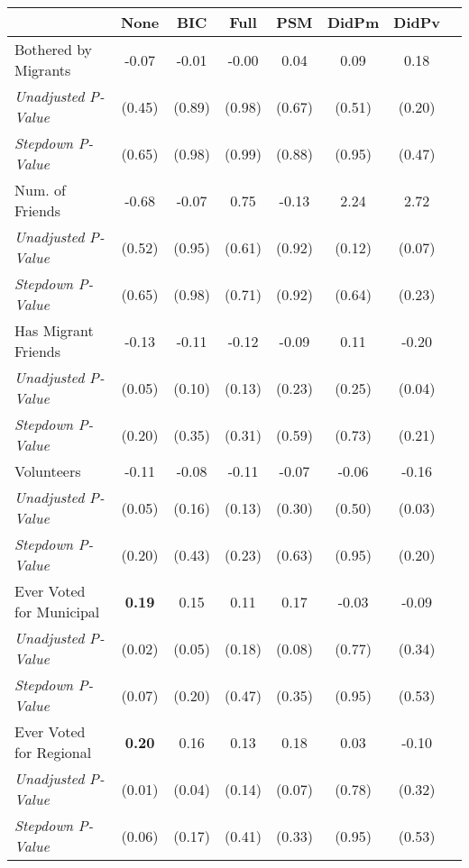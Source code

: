 \begin{tabular}{l c c c c c c c}
\toprule
 & None & BIC & Full & PSM & DidPm & DidPv \\
\midrule
Bothered by Migrants & -0.07 & -0.01 & -0.00 & 0.04 & 0.09 & 0.18 \\
\quad \textit{Unadjusted P-Value} & (0.45) & (0.89) & (0.98) & (0.67) & (0.51) & (0.20) \\
\quad \textit{Stepdown P-Value} & (0.65) & (0.98) & (0.99) & (0.88) & (0.95) & (0.47) \\
Num. of Friends & -0.68 & -0.07 & 0.75 & -0.13 & 2.24 & 2.72 \\
\quad \textit{Unadjusted P-Value} & (0.52) & (0.95) & (0.61) & (0.92) & (0.12) & (0.07) \\
\quad \textit{Stepdown P-Value} & (0.65) & (0.98) & (0.71) & (0.92) & (0.64) & (0.23) \\
Has Migrant Friends & -0.13 & -0.11 & -0.12 & -0.09 & 0.11 & -0.20 \\
\quad \textit{Unadjusted P-Value} & (0.05) & (0.10) & (0.13) & (0.23) & (0.25) & (0.04) \\
\quad \textit{Stepdown P-Value} & (0.20) & (0.35) & (0.31) & (0.59) & (0.73) & (0.21) \\
Volunteers & -0.11 & -0.08 & -0.11 & -0.07 & -0.06 & -0.16 \\
\quad \textit{Unadjusted P-Value} & (0.05) & (0.16) & (0.13) & (0.30) & (0.50) & (0.03) \\
\quad \textit{Stepdown P-Value} & (0.20) & (0.43) & (0.23) & (0.63) & (0.95) & (0.20) \\
Ever Voted for Municipal & \textbf{ 0.19 } & 0.15 & 0.11 & 0.17 & -0.03 & -0.09 \\
\quad \textit{Unadjusted P-Value} & (0.02) & (0.05) & (0.18) & (0.08) & (0.77) & (0.34) \\
\quad \textit{Stepdown P-Value} & (0.07) & (0.20) & (0.47) & (0.35) & (0.95) & (0.53) \\
Ever Voted for Regional & \textbf{ 0.20 } & 0.16 & 0.13 & 0.18 & 0.03 & -0.10 \\
\quad \textit{Unadjusted P-Value} & (0.01) & (0.04) & (0.14) & (0.07) & (0.78) & (0.32) \\
\quad \textit{Stepdown P-Value} & (0.06) & (0.17) & (0.41) & (0.33) & (0.95) & (0.53) \\
\bottomrule
\end{tabular}

